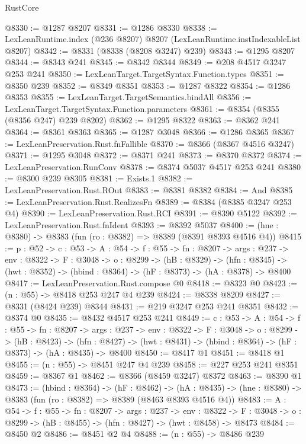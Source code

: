 \begin{lexlean}{RustCore}
\begin{coremodule}
@8330 := @1287 @8207
@8331 := @1286 @8330
@8338 := LexLeanRuntime.index (@236 @8207) @8207 (LexLeanRuntime.instIndexableList @8207)
@8342 := @8331 (@8338 (@8208 @3247) @239)
@8343 := @1295 @8207
@8344 := @8343 @241
@8345 := @8342 @8344
@8349 := @208 @4517 @3247 @253 @241
@8350 := LexLeanTarget.TargetSyntax.Function.types
@8351 := @8350 @239
@8352 := @8349 @8351
@8353 := @1287 @8322
@8354 := @1286 @8353
@8355 := LexLeanTarget.TargetSemantics.bindAll
@8356 := LexLeanTarget.TargetSyntax.Function.parameters
@8361 := @8354 (@8355 (@8356 @247) @239 @8202)
@8362 := @1295 @8322
@8363 := @8362 @241
@8364 := @8361 @8363
@8365 := @1287 @3048
@8366 := @1286 @8365
@8367 := LexLeanPreservation.Rust.fnFallible
@8370 := @8366 (@8367 @4516 @3247)
@8371 := @1295 @3048
@8372 := @8371 @241
@8373 := @8370 @8372
@8374 := LexLeanPreservation.RunConv
@8378 := @8374 @5037 @4517 @253 @241
@8380 := @8300 @239 @8305
@8381 := Exists.{1}
@8382 := LexLeanPreservation.Rust.ROut
@8383 := @8381 @8382
@8384 := And
@8385 := LexLeanPreservation.Rust.RealizesFn
@8389 := @8384 (@8385 @3247 @253 @4)
@8390 := LexLeanPreservation.Rust.RCI
@8391 := @8390 @5122
@8392 := LexLeanPreservation.Rust.fnIdent
@8393 := @8392 @5037
@8400 := (hne : @8380) -> @8383 (fun (ro : @8382) => @8389 (@8391 @8393 @4516 @4))
@8415 := {p : @52} ->
  {c : @53} ->
  {A : @54} ->
  {f : @55} ->
  {fn : @8207} ->
  {args : @237} ->
  {env : @8322} ->
  {F : @3048} ->
  {o : @8299} ->
  (hB : @8329) ->
  (hfn : @8345) -> (hwt : @8352) -> (hbind : @8364) -> (hF : @8373) -> (hA : @8378) -> @8400
@8417 := LexLeanPreservation.Rust.compose @0
@8418 := @8323 @0
@8423 := (n : @55) -> @8418 @253 @247 @4 @239
@8424 := @8338 @8209
@8427 := @8331 (@8424 @239) @8344
@8431 := @219 @3247 @253 @241 @8351
@8432 := @8374 @0
@8435 := @8432 @4517 @253 @241
@8449 := {c : @53} ->
  {A : @54} ->
  {f : @55} ->
  {fn : @8207} ->
  {args : @237} ->
  {env : @8322} ->
  {F : @3048} ->
  {o : @8299} ->
  (hB : @8423) ->
  (hfn : @8427) -> (hwt : @8431) -> (hbind : @8364) -> (hF : @8373) -> (hA : @8435) -> @8400
@8450 := @8417 @1
@8451 := @8418 @1
@8455 := (n : @55) -> @8451 @247 @4 @239
@8458 := @227 @253 @241 @8351
@8459 := @8367 @1
@8462 := @8366 (@8459 @3247) @8372
@8463 := @8390 @1
@8473 := (hbind : @8364) ->
  (hF : @8462) ->
  (hA : @8435) -> (hne : @8380) -> @8383 (fun (ro : @8382) => @8389 (@8463 @8393 @4516 @4))
@8483 := {A : @54} ->
  {f : @55} ->
  {fn : @8207} ->
  {args : @237} ->
  {env : @8322} ->
  {F : @3048} -> {o : @8299} -> (hB : @8455) -> (hfn : @8427) -> (hwt : @8458) -> @8473
@8484 := @8450 @2
@8486 := @8451 @2 @4
@8488 := (n : @55) -> @8486 @239

\end{coremodule}
\end{lexlean}
